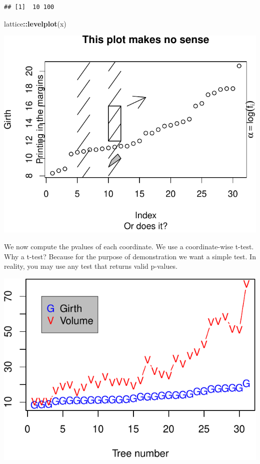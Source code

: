 \documentclass[]{book}
\newenvironment{Shaded}{\begin{snugshade}}{\end{snugshade}}
\newcommand{\ControlFlowTok}[1]{\textcolor[rgb]{0.13,0.29,0.53}{\textbf{#1}}}
\newcommand{\DataTypeTok}[1]{\textcolor[rgb]{0.13,0.29,0.53}{#1}}
\newcommand{\DecValTok}[1]{\textcolor[rgb]{0.00,0.00,0.81}{#1}}
\newcommand{\KeywordTok}[1]{\textcolor[rgb]{0.13,0.29,0.53}{\textbf{#1}}}
\newcommand{\NormalTok}[1]{#1}
\newcommand{\OperatorTok}[1]{\textcolor[rgb]{0.81,0.36,0.00}{\textbf{#1}}}
\newcommand{\StringTok}[1]{\textcolor[rgb]{0.31,0.60,0.02}{#1}}
\theoremstyle{definition}
\theoremstyle{definition}
\theoremstyle{definition}
\theoremstyle{remark}
\begin{document}
\begin{verbatim}
## [1]  10 100
\end{verbatim}

\begin{Shaded}
\begin{Highlighting}[]
\NormalTok{lattice}\OperatorTok{::}\KeywordTok{levelplot}\NormalTok{(x)}
\end{Highlighting}
\end{Shaded}

\includegraphics[width=0.5\linewidth]{Rcourse_files/figure-latex/unnamed-chunk-212-1}

We now compute the pvalues of each coordinate.
We use a coordinate-wise t-test.
Why a t-test? Because for the purpose of demonstration we want a simple test. In reality, you may use any test that returns valid p-values.

\begin{Shaded}
\end{Shaded}

\includegraphics[width=0.5\linewidth]{Rcourse_files/figure-latex/unnamed-chunk-213-1}
\end{document}
